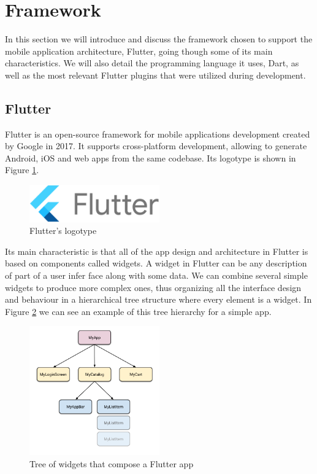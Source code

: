 \section{Framework}

In this section we will introduce and discuss the framework chosen to support the mobile application architecture, Flutter, going though some of its main characteristics. We will also detail the programming language it uses, Dart, as well as the most relevant Flutter plugins that were utilized during development.

\subsection{Flutter}

Flutter \cite{noauthor_flutter_2021} is an open-source framework for mobile applications development created by Google in 2017. It supports cross-platform development, allowing to generate Android, iOS and web apps from the same codebase. Its logotype is shown in Figure \ref{fig:flutter}.

\begin{figure}[h]
  \centering
  \includegraphics[width=0.5\textwidth]{Figures/flutter.png}
  \caption{%
    Flutter's logotype
  }
  \label{fig:flutter}
\end{figure}

Its main characteristic is that all of the app design and architecture in Flutter is based on components called widgets. A widget in Flutter can be any description of part of a user infer face along with some data. We can combine several simple widgets to produce more complex ones, thus organizing all the interface design and behaviour in a hierarchical tree structure where every element is a widget. In Figure \ref{fig:flutter-widgets} we can see an example of this tree hierarchy for a simple app.

\begin{figure}[h]
  \centering
  \includegraphics[width=0.5\textwidth]{Figures/flutter-widgets.png}
  \caption{%
    Tree of widgets that compose a Flutter app
  }
  \label{fig:flutter-widgets}
\end{figure}

